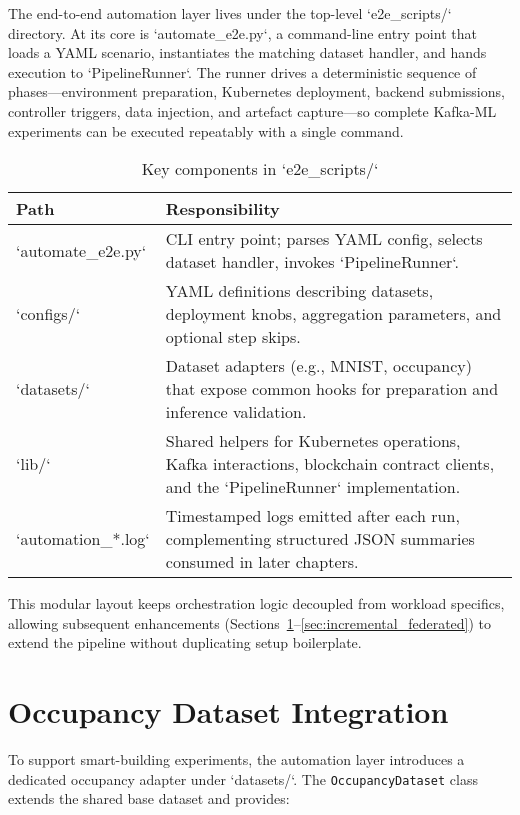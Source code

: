 The end-to-end automation layer lives under the top-level `e2e\_scripts/` directory. At its core is `automate\_e2e.py`, a command-line entry point that loads a YAML scenario, instantiates the matching dataset handler, and hands execution to `PipelineRunner`. The runner drives a deterministic sequence of phases—environment preparation, Kubernetes deployment, backend submissions, controller triggers, data injection, and artefact capture—so complete Kafka-ML experiments can be executed repeatably with a single command.

\begin{table}[h!]
    \centering
    \caption{Key components in `e2e\_scripts/`}
    \label{tab:e2e_components}
    \begin{tabular}{p{} p{}}
        \toprule
        \textbf{Path} & \textbf{Responsibility} \\
        \midrule
        `automate\_e2e.py` & CLI entry point; parses YAML config, selects dataset handler, invokes `PipelineRunner`. \\
        `configs/` & YAML definitions describing datasets, deployment knobs, aggregation parameters, and optional step skips. \\
        `datasets/` & Dataset adapters (e.g., MNIST, occupancy) that expose common hooks for preparation and inference validation. \\
        `lib/` & Shared helpers for Kubernetes operations, Kafka interactions, blockchain contract clients, and the `PipelineRunner` implementation. \\
        `automation_*.log` & Timestamped logs emitted after each run, complementing structured JSON summaries consumed in later chapters. \\
    \bottomrule
    \end{tabular}
\end{table}

This modular layout keeps orchestration logic decoupled from workload specifics, allowing subsequent enhancements (Sections~\ref{sec:occupancy_integration}--\ref{sec:incremental_federated}) to extend the pipeline without duplicating setup boilerplate.

\section{Occupancy Dataset Integration}
\label{sec:occupancy_integration}

To support smart-building experiments, the automation layer introduces a dedicated occupancy adapter under `datasets/`. The \texttt{OccupancyDataset} class extends the shared base dataset and provides:

